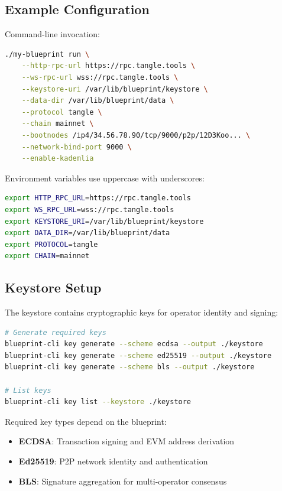 \documentclass[11pt,a4paper]{article}
\begin{document}
\subsection{Example Configuration}

Command-line invocation:
\begin{lstlisting}[language=bash,basicstyle=\ttfamily\small]
./my-blueprint run \
    --http-rpc-url https://rpc.tangle.tools \
    --ws-rpc-url wss://rpc.tangle.tools \
    --keystore-uri /var/lib/blueprint/keystore \
    --data-dir /var/lib/blueprint/data \
    --protocol tangle \
    --chain mainnet \
    --bootnodes /ip4/34.56.78.90/tcp/9000/p2p/12D3Koo... \
    --network-bind-port 9000 \
    --enable-kademlia
\end{lstlisting}

Environment variables use uppercase with underscores:
\begin{lstlisting}[language=bash,basicstyle=\ttfamily\small]
export HTTP_RPC_URL=https://rpc.tangle.tools
export WS_RPC_URL=wss://rpc.tangle.tools
export KEYSTORE_URI=/var/lib/blueprint/keystore
export DATA_DIR=/var/lib/blueprint/data
export PROTOCOL=tangle
export CHAIN=mainnet
\end{lstlisting}

\subsection{Keystore Setup}

The keystore contains cryptographic keys for operator identity and signing:

\begin{lstlisting}[language=bash,basicstyle=\ttfamily\small]
# Generate required keys
blueprint-cli key generate --scheme ecdsa --output ./keystore
blueprint-cli key generate --scheme ed25519 --output ./keystore
blueprint-cli key generate --scheme bls --output ./keystore

# List keys
blueprint-cli key list --keystore ./keystore
\end{lstlisting}

Required key types depend on the blueprint:
\begin{itemize}[noitemsep]
    \item \textbf{ECDSA}: Transaction signing and EVM address derivation
    \item \textbf{Ed25519}: P2P network identity and authentication
    \item \textbf{BLS}: Signature aggregation for multi-operator consensus
\end{itemize}
\end{document}
